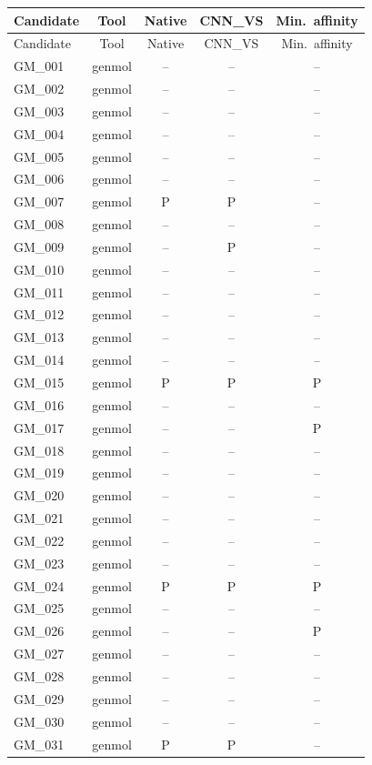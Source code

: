 \documentclass{article}
\begin{document}
\begin{longtable}{lcccc}
\toprule
Candidate & Tool & Native & CNN\_VS & Min.\ affinity \\
\midrule
\endfirsthead
\toprule
Candidate & Tool & Native & CNN\_VS & Min.\ affinity \\
\midrule
\endhead
GM\_001 & genmol & -- & -- & -- \\
GM\_002 & genmol & -- & -- & -- \\
GM\_003 & genmol & -- & -- & -- \\
GM\_004 & genmol & -- & -- & -- \\
GM\_005 & genmol & -- & -- & -- \\
GM\_006 & genmol & -- & -- & -- \\
GM\_007 & genmol & P & P & -- \\
GM\_008 & genmol & -- & -- & -- \\
GM\_009 & genmol & -- & P & -- \\
GM\_010 & genmol & -- & -- & -- \\
GM\_011 & genmol & -- & -- & -- \\
GM\_012 & genmol & -- & -- & -- \\
GM\_013 & genmol & -- & -- & -- \\
GM\_014 & genmol & -- & -- & -- \\
GM\_015 & genmol & P & P & P \\
GM\_016 & genmol & -- & -- & -- \\
GM\_017 & genmol & -- & -- & P \\
GM\_018 & genmol & -- & -- & -- \\
GM\_019 & genmol & -- & -- & -- \\
GM\_020 & genmol & -- & -- & -- \\
GM\_021 & genmol & -- & -- & -- \\
GM\_022 & genmol & -- & -- & -- \\
GM\_023 & genmol & -- & -- & -- \\
GM\_024 & genmol & P & P & P \\
GM\_025 & genmol & -- & -- & -- \\
GM\_026 & genmol & -- & -- & P \\
GM\_027 & genmol & -- & -- & -- \\
GM\_028 & genmol & -- & -- & -- \\
GM\_029 & genmol & -- & -- & -- \\
GM\_030 & genmol & -- & -- & -- \\
GM\_031 & genmol & P & P & -- \\

\end{longtable}
\end{document}

